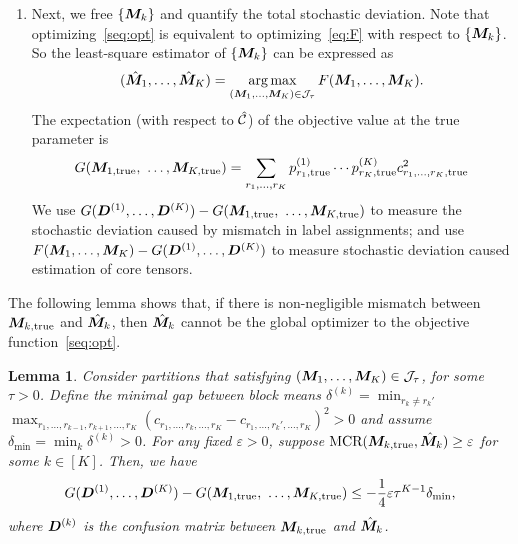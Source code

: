 \documentclass{article}
\newtheorem{lemma}{Lemma}
\begin{document}
\begin{appendices}
\begin{enumerate}
\item Next, we free $\{\bm M_k\}$ and quantify the total stochastic deviation. Note that optimizing~\eqref{seq:opt} is equivalent to optimizing~\eqref{eq:F} with respect to $\{\bm M_k\}$. So the least-square estimator of $\{\bm M_k\}$ can be expressed as
\begin{equation}
   (\hat{\bm M}_1,\ldots,\hat{\bm M}_K) = \displaystyle\operatorname*{arg\,max}_{(\bm M_1,\ldots,\bm M_K)\in \mathcal{J}_\tau}F(\bm M_1,\ldots,\bm M_K).
\end{equation}
The expectation (with respect to $\hat {\mathcal{C}}$) of the objective value at the true parameter is
\[
G(\mM_{1,\text{true}},\ \ldots,\mM_{K,\text{true}})=\sum_{r_1,\ldots,r_K} p^{(1)}_{r_1,\text{true}} \cdots p^{(K)}_{r_K,\text{true}}c^2_{r_1,\ldots,r_K,\text{true}}
\]
We use $ G(\mD^{(1)},\ldots,\mD^{(K)})-G(\mM_{1,\text{true}},\ \ldots,\mM_{K,\text{true}})$ to measure the stochastic deviation caused by mismatch in label assignments; and use $F(\bm M_1,\ldots,\bm M_K)-G(\bm{D}^{(1)},\ldots,\bm{D}^{(K)})$ to measure stochastic deviation caused estimation of core tensors.  


\end{enumerate}

The following lemma shows that, if there is non-negligible mismatch between $\bm M_{k,\text{true}}$ and $\hat {\bm M}_k$, then $\hat {\bm M}_k$ cannot be the global optimizer to the objective function~\eqref{seq:opt}.

\begin{lemma}\label{1}
Consider partitions that satisfying $(\bm M_1,\ldots,\bm M_K)\in \mathcal{J}_\tau$, for some $\tau>0$. 
Define the minimal gap between block means $\delta^{(k)}=\min_{r_k\neq r_k'}$ $\max_{r_1,\ldots,r_{k-1},r_{k+1},\ldots,r_K}(c_{r_1,\ldots,r_k,\ldots,r_K}-c_{r_1,\ldots,r_k',\ldots,r_K})^2>0$ and assume $\delta_{\min}=\min_k\delta^{(k)}>0$. For any fixed $\varepsilon>0$, suppose $\text{MCR}(\bm M_{k,\text{true}}, \hat {\bm M}_k)\geq \varepsilon $ for some $k\in[K]$. Then, we have
\begin{equation*}
    G(\mD^{(1)},\ldots,\mD^{(K)})-G(\mM_{1,\text{true}},\ \ldots,\mM_{K,\text{true}}) \leq -\frac{1}{4}\varepsilon\tau^{K-1}\delta_{\min},
\end{equation*}
where $\bm{D}^{(k)}$ is the confusion matrix between $\bm M_{k,\text{true}}$ and $\hat {\bm M}_k$.
\end{lemma}


\end{appendices}
\end{document}
